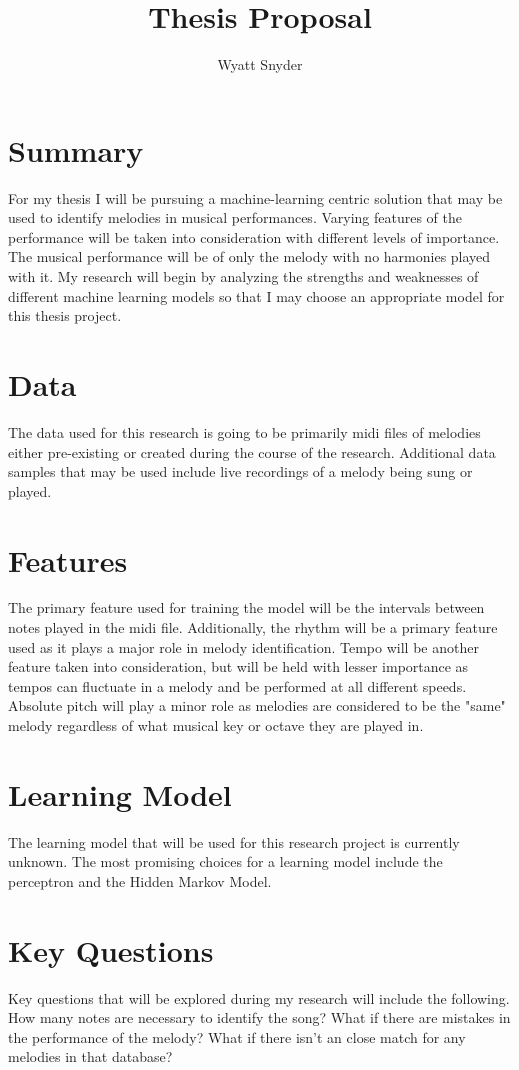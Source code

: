 \documentclass{article}
\title{Thesis Proposal}
\author{Wyatt Snyder}
\begin{document}
	\maketitle
	\section{Summary}
	For my thesis I will be pursuing a machine-learning centric solution that may be used to identify melodies in musical performances. Varying features of the performance will be taken into consideration with different levels of importance. The musical performance will be of only the melody with no harmonies played with it. My research will begin by analyzing the strengths and weaknesses of different machine learning models so that I may choose an appropriate model for this thesis project. 
	
	\section{Data}
	The data used for this research is going to be primarily midi files of melodies either pre-existing or created during the course of the research. Additional data samples that may be used include live recordings of a melody being sung or played.
	
	\section{Features}
	The primary feature used for training the model will be the intervals between notes played in the midi file. Additionally, the rhythm will be a primary feature used as it plays a major role in melody identification. Tempo will be another feature taken into consideration, but will be held with lesser importance as tempos can fluctuate in a melody and be performed at all different speeds. Absolute pitch will play a minor role as melodies are considered to be the "same" melody regardless of what musical key or octave they are played in.  
	
	\section{Learning Model}
	The learning model that will be used for this research project is currently unknown. The most promising choices for a learning model include the perceptron and the Hidden Markov Model.
	
	\section{Key Questions}
	Key questions that will be explored during my research will include the following. How many notes are necessary to identify the song? What if there are mistakes in the performance of the melody? What if there isn't an close match for any melodies in that database?
	
\end{document}
